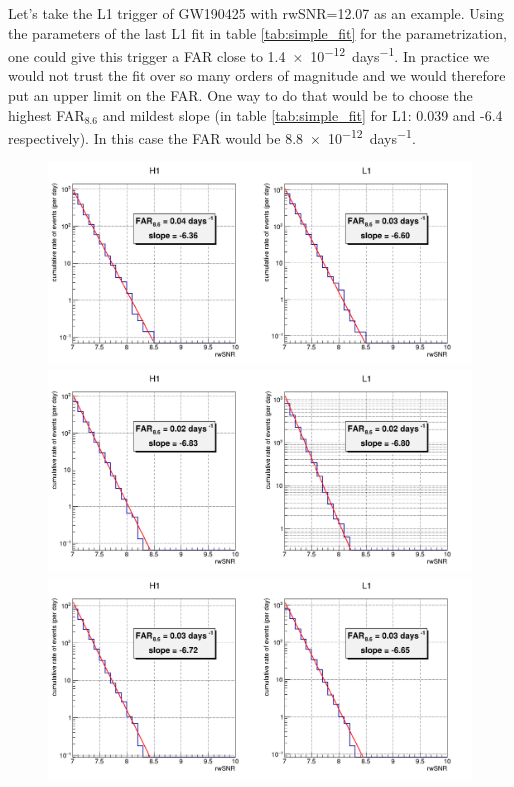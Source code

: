 Let's take the L1 trigger of GW190425 with rwSNR=12.07 as an example.
Using the parameters of the last L1 fit in table \ref{tab:simple_fit} for the parametrization, one could give this trigger a FAR close to \SI{1.4e-12}{days^{-1}}.
In practice we would not trust the fit over so many orders of magnitude and we would therefore put an upper limit on the FAR.
One way to do that would be to choose the highest FAR$_{8.6}$ and mildest slope (in table \ref{tab:simple_fit} for L1: 0.039 and -6.4 respectively).
In this case the FAR would be \SI{8.8e-12}{days^{-1}}.

\begin{figure}
  \centering
  \begin{minipage}{0.9\linewidth}
    \centering
    \includegraphics[width=0.9\linewidth]{sectionFAR/simpleFit/cSimpleFit_7_8days.png}
  \end{minipage}
  \hfill
  \begin{minipage}{0.9\linewidth}
    \centering
    \includegraphics[width=0.9\linewidth]{sectionFAR/simpleFit/cSimpleFit_8_8days.png}
  \end{minipage}
  \hfill
  \begin{minipage}{0.9\linewidth}
    \centering
    \includegraphics[width=0.9\linewidth]{sectionFAR/simpleFit/cSimpleFit_6_6days.png}

\end{minipage}
\end{figure}
